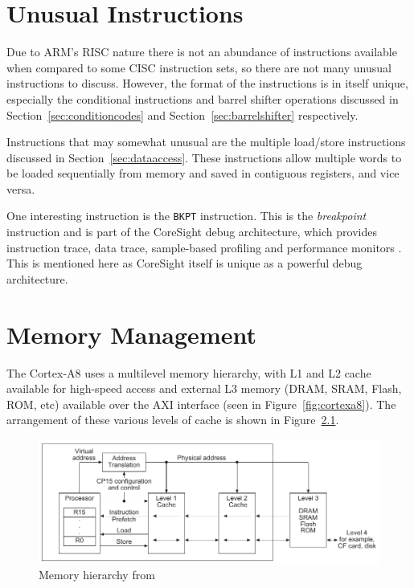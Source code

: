 \documentclass[oneside,a4paper]{report}
\begin{document}
\chapter{Unusual Instructions}

Due to ARM's RISC nature there is not an abundance of instructions available when compared to some CISC instruction sets, so there are not many unusual instructions to discuss. However, the format of the instructions is in itself unique, especially the conditional instructions and barrel shifter operations discussed in Section~\ref{sec:conditioncodes} and Section~\ref{sec:barrelshifter} respectively.

Instructions that may somewhat unusual are the multiple load/store instructions discussed in Section~\ref{sec:dataaccess}. These instructions allow multiple words to be loaded sequentially from memory and saved in contiguous registers, and vice versa.
 
One interesting instruction is the \texttt{BKPT} instruction. This is the \emph{breakpoint} instruction and is part of the CoreSight debug architecture, which provides instruction trace, data trace, sample-based profiling and performance monitors \cite[p. C1-5]{ARMRef}. This is mentioned here as CoreSight itself is unique as a powerful debug architecture.

\chapter{Memory Management}

The Cortex-A8 uses a multilevel memory hierarchy, with L1 and L2 cache available for high-speed access and external L3 memory (DRAM, SRAM, Flash, ROM, etc) available over the AXI interface (seen in Figure~\ref{fig:cortexa8}). The arrangement of these various levels of cache is shown in Figure~\ref{fig:memoryhierarchy}.

\begin{figure}[hb]
	\centering
	\includegraphics[width=1.0\textwidth]{./fig/MemoryHierarchy.pdf}
	\caption{Memory hierarchy from \cite[p. A3-52]{ARMRef}}
	\label{fig:memoryhierarchy}
\end{figure}
\end{document}
